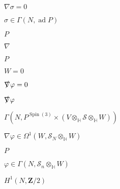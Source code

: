 \begin{preview}
\setcounter{equation}{0}%
\( \nabla \sigma =0 \)
\end{preview}

\begin{preview}
\setcounter{equation}{0}%
\( \sigma \in \Gamma(N, \operatorname{ad} P) \)
\end{preview}

\begin{preview}
\setcounter{equation}{0}%
\( P \)
\end{preview}

\begin{preview}
\setcounter{equation}{0}%
\( \nabla \)
\end{preview}

\begin{preview}
\setcounter{equation}{0}%
\( P \)
\end{preview}

\begin{preview}
\setcounter{equation}{0}%
\( W =0 \)
\end{preview}

\begin{preview}
\setcounter{equation}{0}%
\( \slashed \nabla \varphi =0 \)
\end{preview}

\begin{preview}
\setcounter{equation}{0}%
\( \slashed \nabla \varphi \)
\end{preview}

\begin{preview}
\setcounter{equation}{0}%
\( \Gamma(N, P^{\operatorname{Spin}(3)} \times  (V \otimes _{\mathbb{H}} \mathcal{S} \otimes _{\mathbb{H}} W)) \)
\end{preview}

\begin{preview}
\setcounter{equation}{0}%
\( \nabla \varphi \in \Omega^1(W, \mathcal{S}_N \otimes _{\mathbb{H}} W ) \)
\end{preview}

\begin{preview}
\setcounter{equation}{0}%
\( P \)
\end{preview}

\begin{preview}
\setcounter{equation}{0}%
\( \varphi\in \Gamma(N , \mathcal{S}_n \otimes _{\mathbb{H}} W) \)
\end{preview}

\begin{preview}
\setcounter{equation}{0}%
\( H^1(N , \mathbf{Z}/2) \)
\end{preview}

